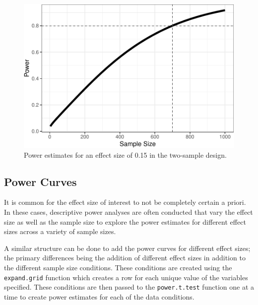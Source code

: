 \documentclass[man,mask,floatsintext]{apa6}
\begin{document}
\begin{figure}
\centering
\includegraphics{power_simulation_files/figure-latex/power-figure-1.pdf}
\caption{\label{fig:power-figure}Power estimates for an effect size of 0.15 in the two-sample design.}
\end{figure}

\hypertarget{power-curves}{%
\subsection{Power Curves}\label{power-curves}}

It is common for the effect size of interest to not be completely certain a priori. In these cases, descriptive power analyses are often conducted that vary the effect size as well as the sample size to explore the power estimates for different effect sizes across a variety of sample sizes.

A similar structure can be done to add the power curves for different effect sizes; the primary differences being the addition of different effect sizes in addition to the different sample size conditions. These conditions are created using the \texttt{expand.grid} function which creates a row for each unique value of the variables specified. These conditions are then passed to the \texttt{power.t.test} function one at a time to create power estimates for each of the data conditions.
\end{document}
